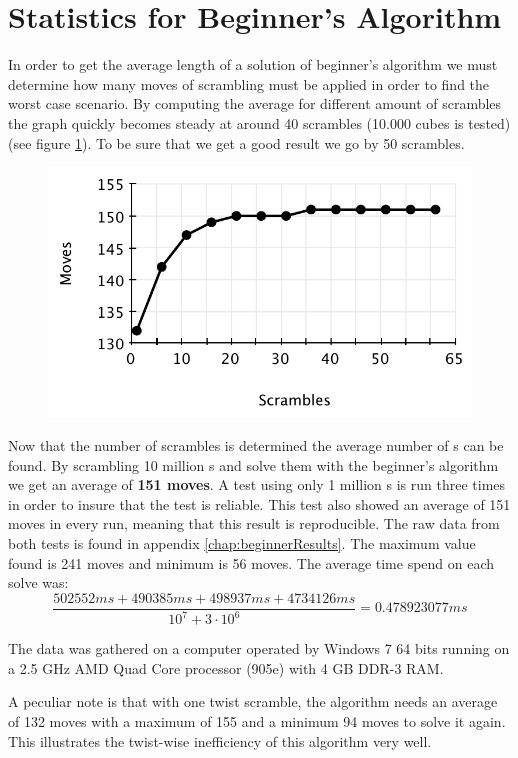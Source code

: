 \section{Statistics for Beginner's Algorithm}
\label{sec:beginnersStat}
In order to get the average length of a solution of beginner's algorithm we must determine how many moves of scrambling must be applied in order to find the worst case scenario. 
By computing the average for different amount of scrambles the graph quickly becomes steady at around 40 scrambles (10.000 cubes is tested) (see figure \ref{fig:beginnersScramble}). To be sure that we get a good result we go by 50 scrambles.
\begin{figure}[htbp]
	\centering
		\includegraphics{input/pics/beginnersScramble.pdf}
	\caption{}
	\label{fig:beginnersScramble}
\end{figure}

Now that the number of scrambles is determined the average number of \twist{}s can be found.
By scrambling 10 million \cube{}s and solve them with the beginner's algorithm we get an average of \textbf{151 moves}.
A test using only 1 million \rubik{}s is run three times in order to insure that the test is reliable.
This test also showed an average of 151 moves in every run, meaning that this result is reproducible.
The raw data from both tests is found in appendix \ref{chap:beginnerResults}.
The maximum value found is 241 moves and minimum is 56 moves.
The average time spend on each solve was:
\[
\frac{502552ms+490385ms+498937ms+4734126ms}{10^{7} + 3 \cdot 10^{6}} = 0.478923077ms
\]

The data was gathered on a computer operated by Windows 7 64 bits running on a 2.5 GHz AMD Quad Core processor (905e) with 4 GB DDR-3 RAM.

A peculiar note is that with one twist scramble, the algorithm needs an average of 132 moves with a maximum of 155 and a minimum 94 moves to solve it again.
This illustrates the twist-wise inefficiency of this algorithm very well.